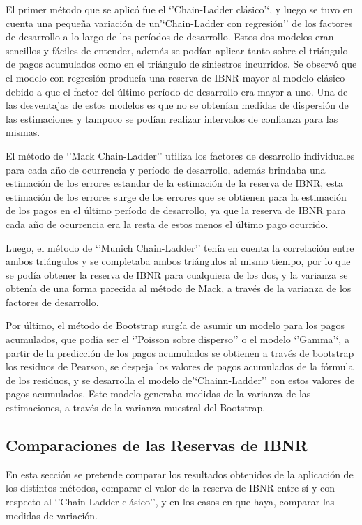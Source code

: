 \documentclass[
  12pt,
]{article}
\begin{document}
El primer método que se aplicó fue el `'Chain-Ladder clásico'`, y luego
se tuvo en cuenta una pequeña variación de un'`Chain-Ladder con
regresión'' de los factores de desarrollo a lo largo de los períodos de
desarrollo. Estos dos modelos eran sencillos y fáciles de entender,
además se podían aplicar tanto sobre el triángulo de pagos acumulados
como en el triángulo de siniestros incurridos. Se observó que el modelo
con regresión producía una reserva de IBNR mayor al modelo clásico
debido a que el factor del último período de desarrollo era mayor a uno.
Una de las desventajas de estos modelos es que no se obtenían medidas de
dispersión de las estimaciones y tampoco se podían realizar intervalos
de confianza para las mismas.

El método de `'Mack Chain-Ladder'' utiliza los factores de desarrollo
individuales para cada año de ocurrencia y período de desarrollo, además
brindaba una estimación de los errores estandar de la estimación de la
reserva de IBNR, esta estimación de los errores surge de los errores que
se obtienen para la estimación de los pagos en el último período de
desarrollo, ya que la reserva de IBNR para cada año de ocurrencia era la
resta de estos menos el último pago ocurrido.

Luego, el método de `'Munich Chain-Ladder'' tenía en cuenta la
correlación entre ambos triángulos y se completaba ambos triángulos al
mismo tiempo, por lo que se podía obtener la reserva de IBNR para
cualquiera de los dos, y la varianza se obtenía de una forma parecida al
método de Mack, a través de la varianza de los factores de desarrollo.

Por último, el método de Bootstrap surgía de asumir un modelo para los
pagos acumulados, que podía ser el `'Poisson sobre disperso'' o el
modelo `'Gamma'`, a partir de la predicción de los pagos acumulados se
obtienen a través de bootstrap los residuos de Pearson, se despeja los
valores de pagos acumulados de la fórmula de los residuos, y se
desarrolla el modelo de'`Chainn-Ladder'' con estos valores de pagos
acumulados. Este modelo generaba medidas de la varianza de las
estimaciones, a través de la varianza muestral del Bootstrap.

\subsection{Comparaciones de las Reservas de
IBNR}\label{comparaciones-de-las-reservas-de-ibnr}

En esta sección se pretende comparar los resultados obtenidos de la
aplicación de los distintos métodos, comparar el valor de la reserva de
IBNR entre sí y con respecto al `'Chain-Ladder clásico'', y en los casos
en que haya, comparar las medidas de variación.
\end{document}
